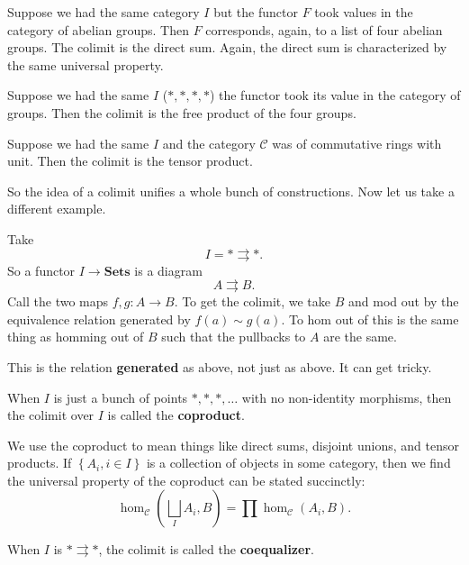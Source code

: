 \begin{example}
Suppose we had the same category $I$ but the functor $F$ took values in the
category of abelian groups. Then $F$
corresponds, again, to a list of four abelian groups. The colimit is the direct
sum. Again, the direct sum is characterized by the same universal property.
\end{example}

\begin{example}
Suppose we had the same $I$ ($\ast, \ast, \ast, \ast$) the functor took its
value in the category of groups. Then the colimit is the
free product of the four groups.
\end{example}

\begin{example}
Suppose we had the same $I$ and the category $\mathcal{C}$ was of commutative
rings with unit. Then the colimit is the tensor product.
\end{example}

So the idea of a colimit unifies a whole bunch of constructions.
Now let us take a different example.

\begin{example}
Take
\[ I = \ast \rightrightarrows \ast.  \]
So a functor $I \to \mathbf{Sets}$ is a diagram
\[ A \rightrightarrows B.  \]
Call the two maps $f,g: A \to B$. To get the colimit, we take $B$ and mod out
by the equivalence relation generated by $f(a) \sim g(a)$.
To hom out of this is the same thing as homming  out of $B$ such that the
pullbacks to $A$ are the same.

This is the relation \textbf{generated} as above, not just as above. It can get
tricky.
\end{example}

\begin{definition}
When $I$ is just a bunch of points  $\ast, \ast, \ast, \dots$ with no
non-identity morphisms, then the
colimit over $I$ is called the \textbf{coproduct}.
\end{definition}

We use the coproduct to mean things like direct sums, disjoint unions, and
tensor products.
If $\left\{A_i, i \in I\right\}$ is a collection of objects in some category,
then we find the universal property of the coproduct can be stated succinctly:
\[ \hom_{\mathcal{C}}(\bigsqcup_I A_i, B) = \prod \hom_{\mathcal{C}}(A_i, B).  \]

\begin{definition}
When $I$ is $\ast \rightrightarrows \ast$, the colimit is called the
\textbf{coequalizer}.
\end{definition}

